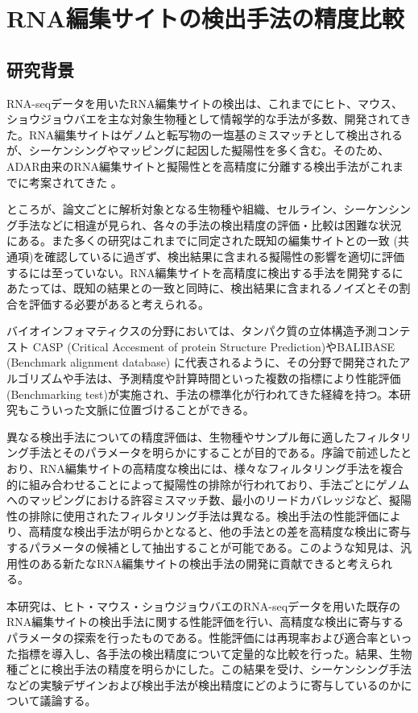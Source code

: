 \chapter{RNA編集サイトの検出手法の精度比較}
\label{bench}
\section{研究背景}
RNA-seqデータを用いたRNA編集サイトの検出は、これまでにヒト、マウス、ショウジョウバエを主な対象生物種として情報学的な手法が多数、開発されてきた。RNA編集サイトはゲノムと転写物の一塩基のミスマッチとして検出されるが、シーケンシングやマッピングに起因した擬陽性を多く含む。そのため、ADAR由来のRNA編集サイトと擬陽性とを高精度に分離する検出手法がこれまでに考案されてきた \citep{Lee:2013aa}。
\par
ところが、論文ごとに解析対象となる生物種や組織、セルライン、シーケンシング手法などに相違が見られ、各々の手法の検出精度の評価・比較は困難な状況にある。また多くの研究はこれまでに同定された既知の編集サイトとの一致 (共通項)を確認しているに過ぎず、検出結果に含まれる擬陽性の影響を適切に評価するには至っていない。RNA編集サイトを高精度に検出する手法を開発するにあたっては、既知の結果との一致と同時に、検出結果に含まれるノイズとその割合を評価する必要があると考えられる。
\par
バイオインフォマティクスの分野においては、タンパク質の立体構造予測コンテスト CASP (Critical Accesment of protein Structure Prediction)やBALIBASE (Benchmark alignment database) \citep{ThoKoeRip0510}に代表されるように、その分野で開発されたアルゴリズムや手法は、予測精度や計算時間といった複数の指標により性能評価 (Benchmarking test)が実施され、手法の標準化が行われてきた経緯を持つ。本研究もこういった文脈に位置づけることができる。
\par
異なる検出手法についての精度評価は、生物種やサンプル毎に適したフィルタリング手法とそのパラメータを明らかにすることが目的である。序論で前述したとおり、RNA編集サイトの高精度な検出には、様々なフィルタリング手法を複合的に組み合わせることによって擬陽性の排除が行われており、手法ごとにゲノムへのマッピングにおける許容ミスマッチ数、最小のリードカバレッジなど、擬陽性の排除に使用されたフィルタリング手法は異なる。検出手法の性能評価により、高精度な検出手法が明らかとなると、他の手法との差を高精度な検出に寄与するパラメータの候補として抽出することが可能である。このような知見は、汎用性のある新たなRNA編集サイトの検出手法の開発に貢献できると考えられる。
\par
本研究は、ヒト・マウス・ショウジョウバエのRNA-seqデータを用いた既存のRNA編集サイトの検出手法に関する性能評価を行い、高精度な検出に寄与するパラメータの探索を行ったものである。性能評価には再現率および適合率といった指標を導入し、各手法の検出精度について定量的な比較を行った。結果、生物種ごとに検出手法の精度を明らかにした。この結果を受け、シーケンシング手法などの実験デザインおよび検出手法が検出精度にどのように寄与しているのかについて議論する。

